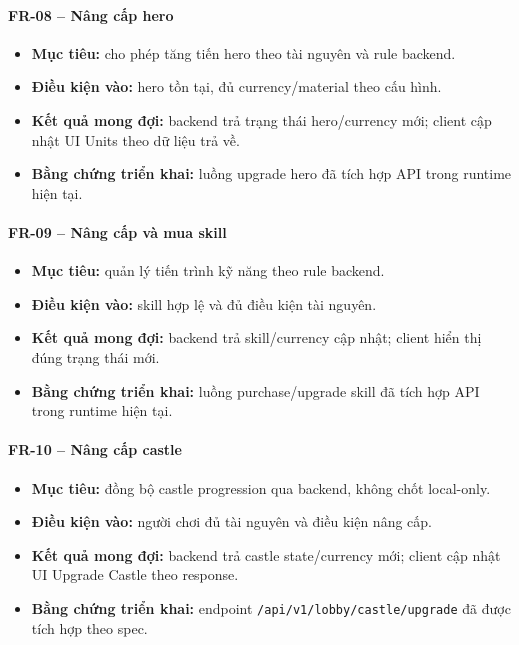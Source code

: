\paragraph{FR-08 -- Nâng cấp hero}
\begin{itemize}
    \item \textbf{Mục tiêu:} cho phép tăng tiến hero theo tài nguyên và rule backend.
    \item \textbf{Điều kiện vào:} hero tồn tại, đủ currency/material theo cấu hình.
    \item \textbf{Kết quả mong đợi:} backend trả trạng thái hero/currency mới; client cập nhật UI Units theo dữ liệu trả về.
    \item \textbf{Bằng chứng triển khai:} luồng upgrade hero đã tích hợp API trong runtime hiện tại.
\end{itemize}

\paragraph{FR-09 -- Nâng cấp và mua skill}
\begin{itemize}
    \item \textbf{Mục tiêu:} quản lý tiến trình kỹ năng theo rule backend.
    \item \textbf{Điều kiện vào:} skill hợp lệ và đủ điều kiện tài nguyên.
    \item \textbf{Kết quả mong đợi:} backend trả skill/currency cập nhật; client hiển thị đúng trạng thái mới.
    \item \textbf{Bằng chứng triển khai:} luồng purchase/upgrade skill đã tích hợp API trong runtime hiện tại.
\end{itemize}

\paragraph{FR-10 -- Nâng cấp castle}
\begin{itemize}
    \item \textbf{Mục tiêu:} đồng bộ castle progression qua backend, không chốt local-only.
    \item \textbf{Điều kiện vào:} người chơi đủ tài nguyên và điều kiện nâng cấp.
    \item \textbf{Kết quả mong đợi:} backend trả castle state/currency mới; client cập nhật UI Upgrade Castle theo response.
    \item \textbf{Bằng chứng triển khai:} endpoint \texttt{/api/\allowbreak v1/\allowbreak lobby/\allowbreak castle/\allowbreak upgrade} đã được tích hợp theo spec.
\end{itemize}

